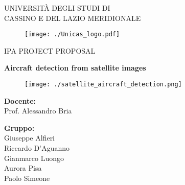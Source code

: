 
    \thispagestyle{empty}




    \begin{center}
        \normalsize{UNIVERSITÀ DEGLI STUDI DI \\ CASSINO E DEL LAZIO MERIDIONALE}
    \end{center}
    
    
    
    \begin{figure}[!htp]
        \centering
        \texttt{[image: ./Unicas\_logo.pdf]}
    \end{figure}
    
    
    \begin{center}
        \Large{IPA PROJECT PROPOSAL}
    \end{center}
    
    
    \vspace{7mm}
    
    
    \begin{center}
        \LARGE{\textbf{Aircraft detection from satellite images}}
    \end{center}
    
    
    
    \begin{figure}[!htp]
        \centering
        \texttt{[image: ./satellite\_aircraft\_detection.png]}
    \end{figure}
    
    \vspace{10mm}
    
    
    \begin{minipage}[t]{0.47\textwidth}
        {\normalsize{\textbf{Docente:}}{\normalsize\vspace{3mm}
        \\ \large{Prof. Alessandro Bria}}}
    \end{minipage}
    \hfill
    \begin{minipage}[t]{0.47\textwidth}\raggedleft
        {\normalsize{\textbf{Gruppo:}}{\normalsize\vspace{3mm} 
            \\ \large{Giuseppe Alfieri \\
                      Riccardo D'Aguanno \\
                      Gianmarco Luongo \\
                      Aurora Pisa \\
                      Paolo Simeone}}}
    \end{minipage}
    
    
    \vspace{10mm}
    
    
    {\par}
    
    